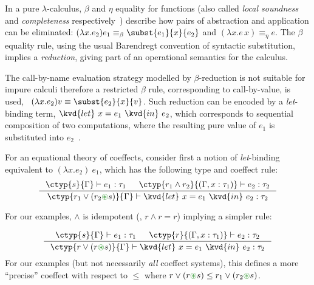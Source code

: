 In a pure $\lambda$-calculus, $\beta$ and $\eta$ equality for
functions (also called \emph{local soundness} and \emph{completeness}
respectively~\cite{logic-modal-reconstruction})
describe how pairs of abstraction and application can be eliminated:
$(\lambda x . e_2) e_1 \equiv_\beta \subst{e_1}{x}{e_2}$ and $(\lambda x . e \, x) 
\equiv_\eta e$. The $\beta$ equality rule, using the usual Barendregt convention of 
syntactic substitution, implies a \emph{reduction},
giving part of an operational semantics for the calculus.

The call-by-name evaluation strategy modelled by $\beta$-reduction is
not suitable for impure calculi therefore a restricted $\beta$ rule,
corresponding to call-by-value, is used, \ie~$(\lambda x . e_2) v
\equiv \subst{e_2}{x}{v}$. Such reduction can be encoded by a
\emph{let}-binding term, $\kvd{let}~x=e_1~\kvd{in}~e_2$, which
corresponds to sequential composition of two computations, where the
resulting pure value of $e_1$ is substituted into
$e_2$~\cite{monads-inaction,monad-notions}.

%
% 

For an equational theory of coeffects, consider first a notion 
of \emph{let}-binding equivalent to $(\lambda x . e_2)~e_1$, which
has the following type and coeffect rule:
%
\begin{equation}
\inference
  {\ctyp{s}{\Gamma} \vdash e_1 : \tau_1 &
   \ctyp{r_1 \wedge r_2}{(\Gamma, x : \tau_1)} \vdash e_2 : \tau_2}
  {\ctyp{r_1 \vee (r_2 \cseq s)}{\Gamma} \vdash \kvd{let}~x = e_1~\kvd{in}~e_2
: \tau_2 }
\label{eq:let1}
\end{equation}

\noindent
For our examples, $\wedge$ is idempotent (\ie{}, $r \wedge r = r$)
implying a simpler rule:

%
\begin{equation}
\inference
  {\ctyp{s}{\Gamma} \vdash e_1 : \tau_1 &
   \ctyp{r}{(\Gamma, x : \tau_1)} \vdash e_2 : \tau_2}
  {\ctyp{r \vee (r \cseq s)}{\Gamma} \vdash \kvd{let}~x = e_1~\kvd{in}~e_2 : \tau_2 }
\label{eq:let2}
\end{equation}
For our examples (but not necessarily \emph{all} coeffect
systems), this defines a more ``precise'' coeffect with respect to $\leq$
where $r \vee (r \cseq s) \leq r_1 \vee (r_2 \cseq s)$.


